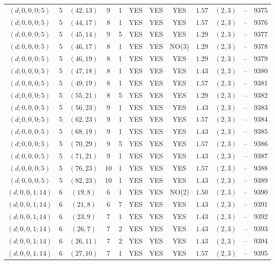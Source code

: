 \begin{longtable}{|c|c|c|c|c|c|c|c|c|c|c|c|}
$(d;0,0,0;5)$ & 5 & $(42,13)$ & 9 & 1 & YES & YES & YES & $1.57$ & $(2,3)$ & -- & 9375\\
$(d;0,0,0;5)$ & 5 & $(44,17)$ & 8 & 1 & YES & YES & YES & $1.57$ & $(2,3)$ & -- & 9376\\
$(d;0,0,0;5)$ & 5 & $(45,14)$ & 9 & 5 & YES & YES & YES & $1.29$ & $(2,3)$ & -- & 9377\\
$(d;0,0,0;5)$ & 5 & $(46,17)$ & 8 & 1 & YES & YES & NO(3) & $1.29$ & $(2,3)$ & -- & 9378\\
$(d;0,0,0;5)$ & 5 & $(46,19)$ & 8 & 1 & YES & YES & YES & $1.29$ & $(2,3)$ & -- & 9379\\
$(d;0,0,0;5)$ & 5 & $(47,18)$ & 8 & 1 & YES & YES & YES & $1.43$ & $(2,3)$ & -- & 9380\\
$(d;0,0,0;5)$ & 5 & $(49,19)$ & 8 & 1 & YES & YES & YES & $1.57$ & $(2,3)$ & -- & 9381\\
$(d;0,0,0;5)$ & 5 & $(55,21)$ & 8 & 5 & YES & YES & YES & $1.29$ & $(2,3)$ & -- & 9382\\
$(d;0,0,0;5)$ & 5 & $(56,23)$ & 9 & 1 & YES & YES & YES & $1.43$ & $(2,3)$ & -- & 9383\\
$(d;0,0,0;5)$ & 5 & $(62,23)$ & 9 & 1 & YES & YES & YES & $1.57$ & $(2,3)$ & -- & 9384\\
$(d;0,0,0;5)$ & 5 & $(68,19)$ & 9 & 1 & YES & YES & YES & $1.43$ & $(2,3)$ & -- & 9385\\
$(d;0,0,0;5)$ & 5 & $(70,29)$ & 9 & 5 & YES & YES & YES & $1.57$ & $(2,3)$ & -- & 9386\\
$(d;0,0,0;5)$ & 5 & $(71,21)$ & 9 & 1 & YES & YES & YES & $1.43$ & $(2,3)$ & -- & 9387\\
$(d;0,0,0;5)$ & 5 & $(76,23)$ & 10 & 1 & YES & YES & YES & $1.57$ & $(2,3)$ & -- & 9388\\
$(d;0,0,0;5)$ & 5 & $(82,23)$ & 10 & 1 & YES & YES & YES & $1.43$ & $(2,3)$ & -- & 9389\\
$(d;0,0,1;14)$ & 6 & $(19,8)$ & 6 & 1 & YES & YES & NO(2) & $1.50$ & $(2,3)$ & -- & 9390\\
$(d;0,0,1;14)$ & 6 & $(21,8)$ & 6 & 7 & YES & YES & YES & $1.43$ & $(2,3)$ & -- & 9391\\
$(d;0,0,1;14)$ & 6 & $(23,9)$ & 7 & 1 & YES & YES & YES & $1.43$ & $(2,3)$ & -- & 9392\\
$(d;0,0,1;14)$ & 6 & $(26,7)$ & 7 & 2 & YES & YES & YES & $1.43$ & $(2,3)$ & -- & 9393\\
$(d;0,0,1;14)$ & 6 & $(26,11)$ & 7 & 2 & YES & YES & YES & $1.43$ & $(2,3)$ & -- & 9394\\
$(d;0,0,1;14)$ & 6 & $(27,10)$ & 7 & 1 & YES & YES & YES & $1.57$ & $(2,3)$ & -- & 9395\\

\end{longtable}
